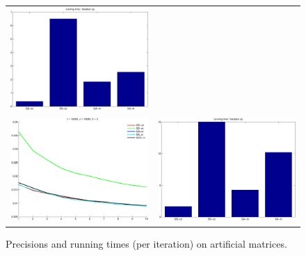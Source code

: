 \documentclass{article}
\begin{document}
\begin{figure}[h!]
\begin{tabular}{cc}
\includegraphics[scale=0.4]{figs/time_DS1_I5000_J5000_1.pdf}\\
\includegraphics[scale=0.4]{figs/prec_DS1_I10000_J10000_1.pdf}&
\includegraphics[scale=0.4]{figs/time_DS1_I10000_J10000_1.pdf}
\end{tabular}
\caption{Precisions and running times (per iteration) on artificial matrices.\label{fig:artificial_results}}
\end{figure}
\end{document}

